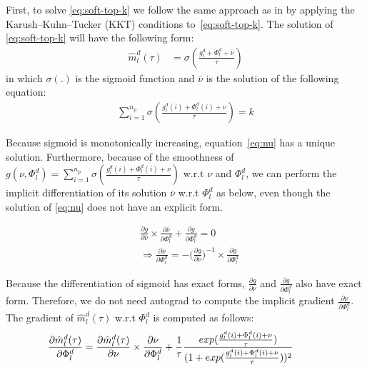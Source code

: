 \documentclass[11pt]{article}
\begin{document}
First, to solve \eqref{eq:soft-top-k} we follow the same approach as in \cite{amos19lml,amos20differential} by applying the Karush–Kuhn–Tucker (KKT) conditions to~\eqref{eq:soft-top-k}. The solution of \eqref{eq:soft-top-k} will have the following form:
\begin{align}
\hat{m}_l^d(\tau) &= \sigma(\frac{g_l^d + \Phi_l^d + \bar{\nu}}{\tau}) \label{eq:soft-m}
\end{align}
in which $\sigma(.)$ is the sigmoid function and $\bar{\nu}$ is the solution of the following equation:
\begin{align}
\displaystyle{\mathop{\sum}_{i=1}^{n_p}} \sigma(\frac{g_l^d(i) + \Phi_l^d(i) + \nu}{\tau}) = k \label{eq:nu}
\end{align}

Because sigmoid is monotonically increasing, equation~\eqref{eq:nu} has a unique solution. Furthermore,  because of the smoothness of $g(\nu,\Phi_l^d) = \displaystyle{\mathop{\sum}_{i=1}^{n_p}} \sigma(\frac{g_l^d(i) + \Phi_l^d(i) + \nu}{\tau})$ w.r.t $\nu$ and $\Phi_l^d$, we can perform the implicit differentiation of its solution $\bar{\nu}$ w.r.t $\Phi_l^d$ as below, even though the solution of \eqref{eq:nu} does not have an explicit form.

\begin{align*}
&\frac{\partial g}{\partial \bar{\nu}} \times \frac{\partial \bar{\nu}}{\partial \Phi_l^d} + \frac{\partial g}{\partial \Phi_l^d} = 0 \\
& \Rightarrow \frac{\partial \bar{\nu}}{\partial \Phi_l^d} = - \big(\frac{\partial g}{\partial \bar{\nu}}\big)^{-1} \times \frac{\partial g}{\partial \Phi_l^d}
\end{align*}

Because the differentiation of sigmoid has exact forms, $\frac{\partial g}{\partial \nu}$ and $\frac{\partial g}{\partial \Phi_l^d}$ also have exact form. Therefore, we do not need autograd to compute the implicit gradient $\frac{\partial \nu}{\partial \Phi_l^d}$. The gradient of $\hat{m}_l^d(\tau)$ w.r.t $\Phi_l^d$ is computed as follows:
\begin{align}
\hspace{-3.em}
\frac{\partial \hat{m}_l^d(\tau)}{\partial \Phi_l^d} = \frac{\partial \hat{m}_l^d(\tau)}{\partial \nu} \times \frac{\partial \nu}{\partial \Phi_l^d} + \frac{1}{\tau} \frac{exp(\frac{g_l^d(i) + \Phi_l^d(i) + \nu}{\tau})}{(1+exp(\frac{g_l^d(i) + \Phi_l^d(i) + \nu}{\tau}))^2}
\end{align}
\end{document}
